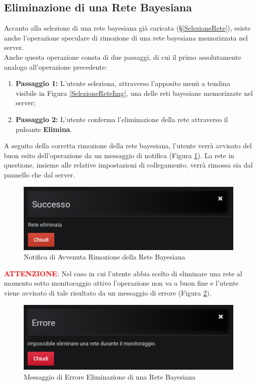 \subsection{Eliminazione di una Rete Bayesiana}\label{EliminazioneRete}

Accanto alla selezione di una rete bayesiana già caricata (§\ref{SelezioneRete}), esiste anche l'operazione speculare di rimozione di una rete bayesiana memorizzata nel server.\\
Anche questa operazione consta di due passaggi, di cui il primo assolutamente analogo all'operazione precedente:
\begin{enumerate}
	\item \textbf{Passaggio 1:} L'utente seleziona, attraverso l'apposito menù a tendina visibile in Figura \ref{SelezioneReteImg}, una delle reti bayesiane memorizzate nel server;
	\item \textbf{Passaggio 2:} L'utente conferma l'eliminazione della rete attraverso il pulsante \textbf{Elimina}.
\end{enumerate}

A seguito della corretta rimozione della rete bayesiana, l'utente verrà avvisato del buon esito dell'operazione da un messaggio di notifica (Figura \ref{NotificaRimozioneRete}). La rete in questione, insieme alle relative impostazioni di collegamento, verrà rimossa sia dal pannello che dal server.

\begin{figure}[H]
	\begin{center}
		\includegraphics[scale=0.6]{./images/NotificaRimozioneRete.png}
		 \caption{Notifica di Avvenuta Rimozione della Rete Bayesiana}	
		 \label{NotificaRimozioneRete}
	\end{center}
\end{figure}

\textbf{\textcolor{red}{ATTENZIONE}}: Nel caso in cui l'utente abbia scelto di eliminare una rete al momento sotto monitoraggio attivo l'operazione non va a buon fine e l'utente viene avvisato di tale risultato da un messaggio di errore (Figura \ref{ErroreDeleteNet}).

\begin{figure}[H]
	\begin{center}
		\includegraphics[scale=0.6]{./images/ErroreDeleteNet.png}
		 \caption{Messaggio di Errore Eliminazione di una Rete Bayesiana}	
		 \label{ErroreDeleteNet}
	\end{center}
\end{figure}
